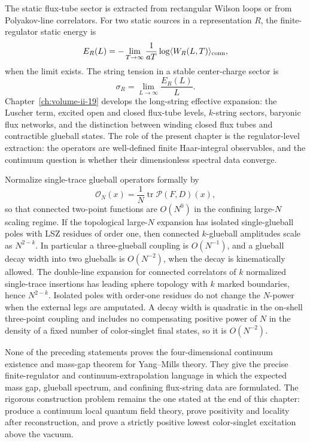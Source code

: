The static flux-tube sector is extracted from rectangular Wilson loops or
from Polyakov-line correlators.  For two static sources in a representation
\(R\), the finite-regulator static energy is
\begin{equation}
  E_R(L)
  =
  -\lim_{T\to\infty}\frac1{aT}
  \log
  \langle W_R(L,T)\rangle_{\rm conn},
  \label{eq:lattice-static-energy-from-wilson-loop}
\end{equation}
when the limit exists.  The string tension in a stable center-charge sector is
\[
  \sigma_R=\lim_{L\to\infty}\frac{E_R(L)}{L}.
\]
Chapter~\ref{ch:volume-ii-19} develops the long-string effective expansion:
the Luscher term, excited open and closed flux-tube levels, \(k\)-string
sectors, baryonic flux networks, and the distinction between winding closed
flux tubes and contractible glueball states.  The role of the present chapter
is the regulator-level extraction: the operators are well-defined finite
Haar-integral observables, and the continuum question is whether their
dimensionless spectral data converge.

\begin{controlledapproximation}
Normalize single-trace glueball operators formally by
\[
  \mathcal O_N(x)=\frac1{N}\operatorname{tr}\mathcal P(F,D)(x),
\]
so that connected two-point functions are \(O(N^0)\) in the confining
large-\(N\) scaling regime.  If the topological large-\(N\) expansion has
isolated
single-glueball poles with LSZ residues of order one, then connected
\(k\)-glueball amplitudes scale as \(N^{2-k}\).  In particular a three-glueball
coupling is \(O(N^{-1})\), and a glueball decay width into two glueballs is
\(O(N^{-2})\), when the decay is kinematically allowed.
The double-line expansion for connected correlators of \(k\) normalized
single-trace insertions has leading sphere topology with \(k\) marked
boundaries, hence \(N^{2-k}\).  Isolated poles with order-one residues do not
change the \(N\)-power when the external legs are amputated.  A decay width is
quadratic in the on-shell three-point coupling and includes no compensating
positive power of \(N\) in the density of a fixed number of color-singlet
final states, so it is \(O(N^{-2})\).
\end{controlledapproximation}

None of the preceding statements proves the four-dimensional continuum
existence and mass-gap theorem for Yang--Mills theory.  They give the precise
finite-regulator and continuum-extrapolation language in which the expected
mass gap, glueball spectrum, and confining flux-string data are formulated.
The rigorous construction problem remains the one stated at the end of this
chapter: produce a continuum local quantum field theory, prove positivity and
locality after reconstruction, and prove a strictly positive lowest
color-singlet excitation above the vacuum.

